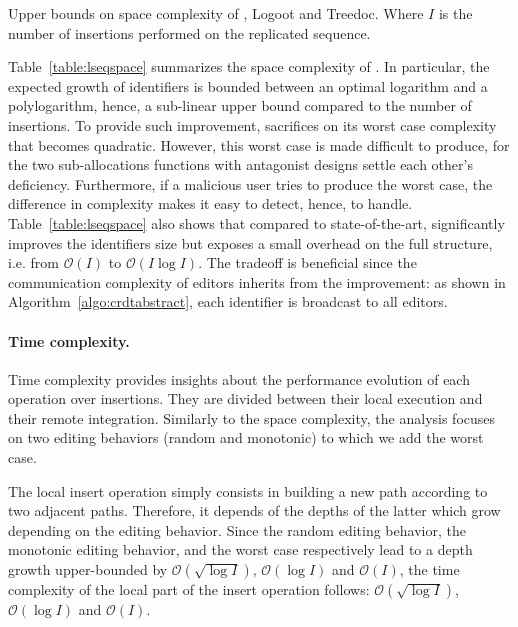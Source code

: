 \begin{table}
  \vspace{\ABOVETABLES}
  \caption{\label{table:lseqspace}
    Upper bounds on space complexity of \LSEQ, Logoot and Treedoc. Where
    $I$ is the number of insertions performed on the replicated sequence.}
  \centering
  
\end{table}

Table~\ref{table:lseqspace} summarizes the space complexity of \LSEQ. In
particular, the expected growth of identifiers is bounded between an optimal
logarithm and a polylogarithm, hence, a sub-linear upper bound compared to the
number of insertions. To provide such improvement, \LSEQ sacrifices on its worst
case complexity that becomes quadratic. However, this worst case is made
difficult to produce, for the two sub-allocations functions with antagonist
designs settle each other's deficiency. Furthermore, if a malicious user tries
to produce the worst case, the difference in complexity makes it easy to detect,
hence, to handle. Table~\ref{table:lseqspace} also shows that compared to
state-of-the-art, \LSEQ significantly improves the identifiers size but exposes
a small overhead on the full structure, i.e. from $\mathcal{O}(I)$ to
$\mathcal{O}(I\log I)$. The tradeoff is beneficial since the communication
complexity of editors inherits from the improvement: as shown in
Algorithm~\ref{algo:crdtabstract}, each identifier is broadcast to all editors.


\paragraph{Time complexity.}

Time complexity provides insights about the performance evolution of each
operation over insertions. They are divided between their local execution and
their remote integration.  Similarly to the space complexity, the analysis
focuses on two editing behaviors (random and monotonic) to which we add the
worst case.

The local insert operation simply consists in building a new path according to
two adjacent paths. Therefore, it depends of the depths of the latter which grow
depending on the editing behavior. Since the random editing behavior, the
monotonic editing behavior, and the worst case respectively lead to a depth
growth upper-bounded by $\mathcal{O}(\sqrt{\log I})$, $\mathcal{O}(\log I)$ and
$\mathcal{O}(I)$, the time complexity of the local part of the insert operation
follows: $\mathcal{O}(\sqrt{\log I})$, $\mathcal{O}(\log I)$ and
$\mathcal{O}(I)$.

